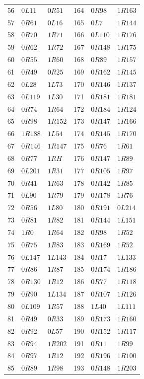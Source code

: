\begin{longtable}{rll@{\qquad}rll}
56 & $0L11$ & $0R51$ & 164 & $0R98$ & $1R163$\\
57 & $0R61$ & $0L16$ & 165 & $0L7$ & $1R144$\\
58 & $0R70$ & $1R71$ & 166 & $0L110$ & $1R176$\\
59 & $0R62$ & $1R72$ & 167 & $0R148$ & $1R175$\\
60 & $0R55$ & $1R60$ & 168 & $0R89$ & $1R157$\\
61 & $0R49$ & $0R25$ & 169 & $0R162$ & $1R145$\\
62 & $0L28$ & $1L73$ & 170 & $0R146$ & $1R137$\\
63 & $0L119$ & $1L30$ & 171 & $0R181$ & $1R181$\\
64 & $0R74$ & $1R64$ & 172 & $0R184$ & $1R124$\\
65 & $0R98$ & $1R152$ & 173 & $0R147$ & $1R166$\\
66 & $1R188$ & $1L54$ & 174 & $0R145$ & $1R170$\\
67 & $0R146$ & $1R147$ & 175 & $0R76$ & $1R61$\\
68 & $0R77$ & $1RH$ & 176 & $0R147$ & $1R89$\\
69 & $0L201$ & $1R31$ & 177 & $0R105$ & $1R97$\\
70 & $0R41$ & $1R63$ & 178 & $0R142$ & $1R85$\\
71 & $0L90$ & $1R79$ & 179 & $0R178$ & $1R76$\\
72 & $0R56$ & $1L80$ & 180 & $0R191$ & $0L214$\\
73 & $0R81$ & $1R82$ & 181 & $0R144$ & $1L151$\\
74 & $1R0$ & $1R64$ & 182 & $0R98$ & $1R52$\\
75 & $0R75$ & $1R83$ & 183 & $0R169$ & $1R52$\\
76 & $0L147$ & $1L143$ & 184 & $0R17$ & $1L133$\\
77 & $0R86$ & $1R87$ & 185 & $0R174$ & $1R186$\\
78 & $0R130$ & $1R12$ & 186 & $0R77$ & $1R118$\\
79 & $0R90$ & $1L134$ & 187 & $0R107$ & $1R126$\\
80 & $0L109$ & $1R57$ & 188 & $1L40$ & $1L111$\\
81 & $0R49$ & $0R33$ & 189 & $0R173$ & $1R160$\\
82 & $0R92$ & $0L57$ & 190 & $0R152$ & $1R117$\\
83 & $0R94$ & $1R202$ & 191 & $0R11$ & $1R99$\\
84 & $0R97$ & $1R12$ & 192 & $0R196$ & $1R100$\\
85 & $0R89$ & $1R98$ & 193 & $0R148$ & $1R203$\\

\end{longtable}
